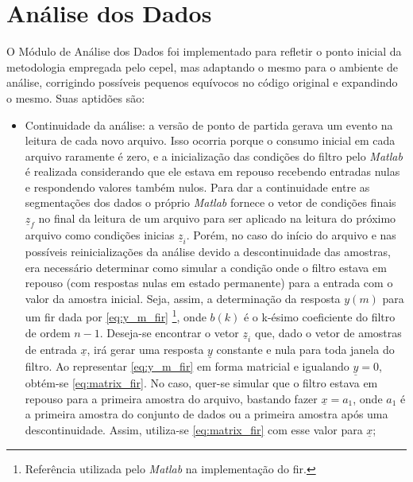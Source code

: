 \section{Análise dos Dados}
\label{sec:analise}

O Módulo de Análise dos Dados foi implementado para refletir o ponto
inicial da metodologia empregada pelo \acs{cepel}, mas adaptando o
mesmo para o ambiente de análise, corrigindo possíveis pequenos
equívocos no código original e expandindo o mesmo. Suas aptidões
são:

\begin{itemize}
\item Continuidade da análise: a versão de ponto de partida gerava
um evento na leitura de cada novo arquivo. Isso ocorria porque o
consumo inicial em cada arquivo raramente é zero, e a inicialização
das condições do filtro pelo \emph{Matlab} é realizada considerando
que ele estava em repouso recebendo entradas nulas e respondendo
valores também nulos. Para dar a continuidade entre as segmentações
dos dados o próprio \emph{Matlab} fornece o vetor de condições finais
$\underline{z}_f$ no final da leitura de um arquivo para ser aplicado
na leitura do próximo arquivo como condições inicias
$\underline{z}_i$. Porém, no caso do início do arquivo e nas possíveis
reinicializações da análise devido a descontinuidade das amostras, era
necessário determinar como simular a condição onde o filtro estava em
repouso (com respostas nulas em estado permanente) para a entrada com
o valor da amostra inicial. Seja, assim, a determinação da resposta
$y(m)$ para um \acs{fir} dada por \ref{eq:y_m_fir}
\cite[p.~311-312]{oppenheim}\footnote{Referência utilizada pelo
\emph{Matlab} na implementação do \acs{fir}.}, onde $b(k)$ é o k-ésimo
coeficiente do filtro de ordem $n-1$. Deseja-se encontrar o
vetor $\underline{z}_i$ que, dado o vetor de amostras de entrada
$\underline{x}$, irá gerar uma resposta $\underline{y}$ constante e
nula para toda janela do filtro. Ao representar \ref{eq:y_m_fir} em
forma matricial e igualando $\underline{y}=0$, obtém-se
\ref{eq:matrix_fir}. No caso, quer-se simular que o filtro estava em
repouso para a primeira amostra do arquivo, bastando fazer
$\underline{x}=a_1$, onde $a_1$ é a primeira amostra do conjunto de
dados ou a primeira amostra após uma descontinuidade. Assim,
utiliza-se \ref{eq:matrix_fir} com esse valor para $\underline{x}$;


\end{itemize}
